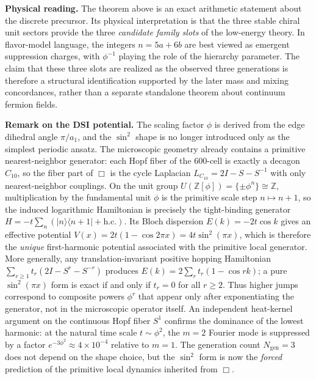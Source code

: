 \documentclass[12pt,a4paper]{article}
\theoremstyle{definition}
\begin{document}
\textbf{Physical reading.}  The theorem above is an exact arithmetic statement about the discrete precursor.  Its physical interpretation is that the three stable chiral unit sectors provide the three \emph{candidate family slots} of the low-energy theory.  In flavor-model language, the integers $n = 5a+6b$ are best viewed as emergent suppression charges, with $\phi^{-1}$ playing the role of the hierarchy parameter.  The claim that these three slots are realized as the observed three generations is therefore a structural identification supported by the later mass and mixing concordances, rather than a separate standalone theorem about continuum fermion fields.

\textbf{Remark on the DSI potential.} The scaling factor $\phi$ is derived from the edge dihedral angle $\pi/a_1$, and the $\sin^2$ shape is no longer introduced only as the simplest periodic ansatz.  The microscopic geometry already contains a primitive nearest-neighbor generator: each Hopf fiber of the 600-cell is exactly a decagon $C_{10}$, so the fiber part of $\Box$ is the cycle Laplacian $L_{C_{10}} = 2I - S - S^{-1}$ with only nearest-neighbor couplings.  On the unit group $U(\mathbb{Z}[\phi]) = \{\pm \phi^n\} \cong \mathbb{Z}$, multiplication by the fundamental unit $\phi$ is the primitive scale step $n \mapsto n+1$, so the induced logarithmic Hamiltonian is precisely the tight-binding generator $H = -t\sum_n(|n\rangle\langle n\!+\!1| + \text{h.c.})$.  Its Bloch dispersion $E(k) = -2t\cos k$ gives an effective potential $V(x) = 2t(1 - \cos 2\pi x) = 4t\sin^2(\pi x)$, which is therefore the \emph{unique} first-harmonic potential associated with the primitive local generator.  More generally, any translation-invariant positive hopping Hamiltonian $\sum_{r\ge1} t_r(2I - S^r - S^{-r})$ produces $E(k) = 2\sum_r t_r(1-\cos rk)$; a pure $\sin^2(\pi x)$ form is exact if and only if $t_r = 0$ for all $r \ge 2$.  Thus higher jumps correspond to composite powers $\phi^r$ that appear only after exponentiating the generator, not in the microscopic operator itself.  An independent heat-kernel argument on the continuous Hopf fiber $S^1$ confirms the dominance of the lowest harmonic: at the natural time scale $t \sim \phi^2$, the $m = 2$ Fourier mode is suppressed by a factor $e^{-3\phi^2} \approx 4 \times 10^{-4}$ relative to $m = 1$.  The generation count $N_{\text{gen}} = 3$ does not depend on the shape choice, but the $\sin^2$ form is now the \emph{forced} prediction of the primitive local dynamics inherited from $\Box$.
\end{document}
